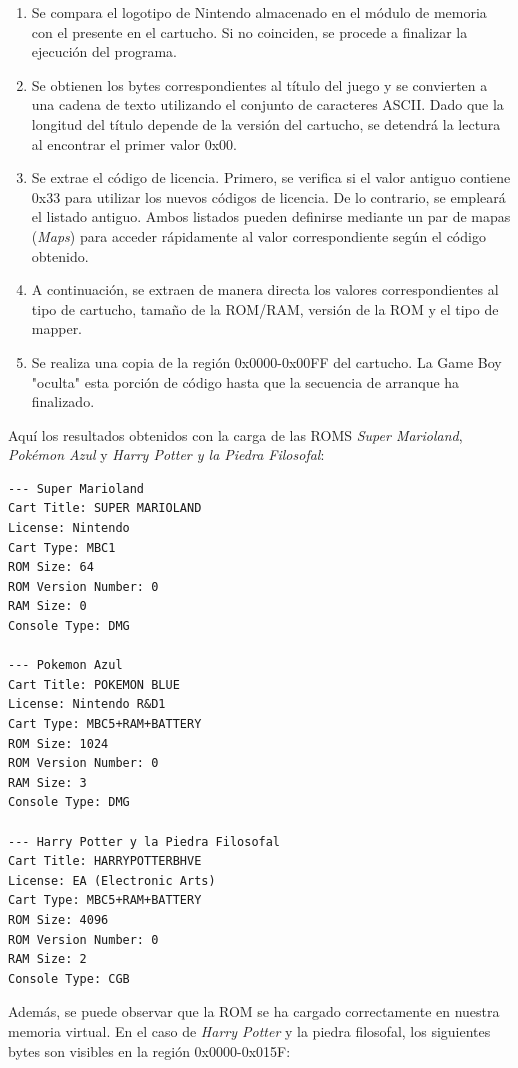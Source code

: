 \begin{enumerate}
    \item Se compara el logotipo de Nintendo almacenado en el módulo de memoria con el presente en el cartucho. Si no coinciden, se procede a finalizar la ejecución del programa.
    \item Se obtienen los bytes correspondientes al título del juego y se convierten a una cadena de texto utilizando el conjunto de caracteres ASCII. Dado que la longitud del título depende de la versión del cartucho, se detendrá la lectura al encontrar el primer valor 0x00.
    \item Se extrae el código de licencia. Primero, se verifica si el valor antiguo contiene 0x33 para utilizar los nuevos códigos de licencia. De lo contrario, se empleará el listado antiguo. Ambos listados pueden definirse mediante un par de mapas (\textit{Maps}) para acceder rápidamente al valor correspondiente según el código obtenido.
    \item A continuación, se extraen de manera directa los valores correspondientes al tipo de cartucho, tamaño de la ROM/RAM, versión de la ROM y el tipo de mapper.
    \item Se realiza una copia de la región 0x0000-0x00FF del cartucho. La Game Boy "oculta" esta porción de código hasta que la secuencia de arranque ha finalizado.
\end{enumerate}

Aquí los resultados obtenidos con la carga de las ROMS \textit{Super Marioland}, \textit{Pokémon Azul} y \textit{Harry Potter y la Piedra Filosofal}:

\begin{lstlisting}[language=Consola, caption={Valores obtenidos tras la carga de ROM.}, label={code:romresults}]
--- Super Marioland
Cart Title: SUPER MARIOLAND
License: Nintendo
Cart Type: MBC1
ROM Size: 64
ROM Version Number: 0
RAM Size: 0
Console Type: DMG

--- Pokemon Azul
Cart Title: POKEMON BLUE
License: Nintendo R&D1
Cart Type: MBC5+RAM+BATTERY
ROM Size: 1024
ROM Version Number: 0
RAM Size: 3
Console Type: DMG

--- Harry Potter y la Piedra Filosofal
Cart Title: HARRYPOTTERBHVE
License: EA (Electronic Arts)
Cart Type: MBC5+RAM+BATTERY
ROM Size: 4096
ROM Version Number: 0
RAM Size: 2
Console Type: CGB
\end{lstlisting}

Además, se puede observar que la ROM se ha cargado correctamente en nuestra memoria virtual. En el caso de \textit{Harry Potter} y la piedra filosofal, los siguientes bytes son visibles en la región 0x0000-0x015F:

